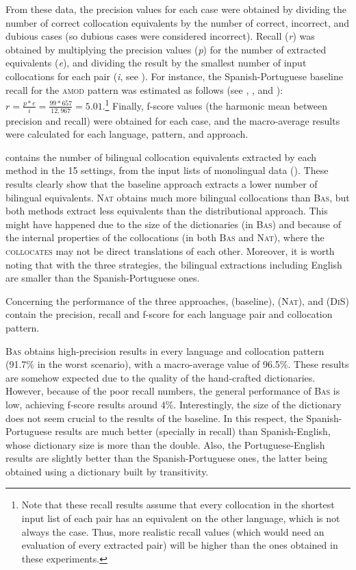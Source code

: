 \documentclass[output=paper
,modfonts
,nonflat]{langsci/langscibook}
\begin{document}
From these data, the precision values for each case were obtained by dividing the number of
correct collocation equivalents by the number of correct, incorrect, and dubious cases (so dubious
cases were considered incorrect). Recall (\textit{r}) was obtained by multiplying the precision values (\textit{p})
for the number of extracted equivalents (\textit{e}), and dividing the result by the smallest number of input collocations
for each pair (\textit{i}, see ). For instance, the Spanish-Portuguese baseline recall for the \textsc{amod}
pattern was estimated as follows (see , , and ):
$r = \frac{p * e}{i} = \frac{99 * 657}{12,967} = 5.01$.\footnote{Note that these recall results assume that
  every collocation in the shortest input list of each pair has an equivalent on the other language,
  which is not always the case. Thus, more realistic recall values (which would need an
  evaluation of every extracted pair) will be higher than the ones obtained in these experiments.}
Finally, f-score values (the harmonic mean between precision and recall) were obtained
for each case, and the macro-average results were calculated for each language, pattern, and approach.

 contains the number of bilingual collocation equivalents extracted by
each method in the 15 settings, from the input lists of monolingual data ().
These results clearly show that the baseline approach extracts a lower number of bilingual equivalents.
\textsc{Nat} obtains much more bilingual collocations than \textsc{Bas}, but both methods
extract less equivalents than the distributional approach. This might have happened due to the
size of the dictionaries (in \textsc{Bas}) and because of the internal properties of the collocations
(in both \textsc{Bas} and \textsc{Nat}), where the \textsc{collocates} may not be direct translations
of each other. Moreover, it is worth noting that with the three strategies, the bilingual extractions
including English are smaller than the Spanish-Portuguese ones.

Concerning the performance of the three approaches,  (baseline),
 (\textsc{Nat}), and  (\textsc{DiS}) contain the precision,
recall and f-score for each language pair and collocation pattern.

\textsc{Bas} obtains high-precision results in every language and collocation
pattern (91.7\% in the worst scenario), with a macro-average value of 96.5\%. These
results are somehow expected due to the quality of the hand-crafted dictionaries. However,
because of the poor recall numbers, the general performance of \textsc{Bas} is low,
achieving f-score results around $4\%$. Interestingly, the size of the dictionary
does not seem crucial to the results of the baseline. In this respect, the
Spanish-Portuguese results are much better (specially in recall) than Spanish-English, whose
dictionary size is more than the double. Also, the Portuguese-English results are slightly
better than the Spanish-Portuguese ones, the latter being obtained using a dictionary
built by transitivity.
\end{document}
